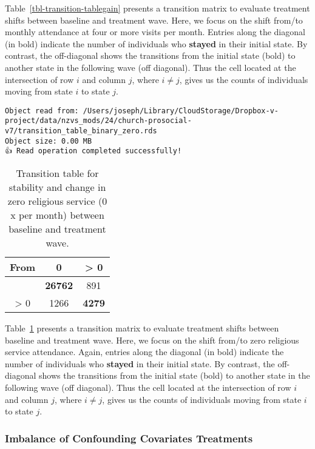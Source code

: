 \documentclass[
  single column]{article}
\begin{document}
Table~\ref{tbl-transition-tablegain} presents a transition matrix to
evaluate treatment shifts between baseline and treatment wave. Here, we
focus on the shift from/to monthly attendance at four or more visits per
month. Entries along the diagonal (in bold) indicate the number of
individuals who \textbf{stayed} in their initial state. By contrast, the
off-diagonal shows the transitions from the initial state (bold) to
another state in the following wave (off diagonal). Thus the cell
located at the intersection of row \(i\) and column \(j\), where
\(i \neq j\), gives us the counts of individuals moving from state \(i\)
to state \(j\).

\begin{verbatim}
Object read from: /Users/joseph/Library/CloudStorage/Dropbox-v-project/data/nzvs_mods/24/church-prosocial-v7/transition_table_binary_zero.rds
Object size: 0.00 MB
👍 Read operation completed successfully!
\end{verbatim}

\begin{longtable}[]{@{}ccc@{}}

\caption{\label{tbl-transition-tableloss}Transition table for stability
and change in zero religious service (0 x per month) between baseline
and treatment wave.}

\tabularnewline

\toprule\noalign{}
From & 0 & \textgreater{} 0 \\
\midrule\noalign{}
\endhead
\bottomrule\noalign{}
\endlastfoot
0 & \textbf{26762} & 891 \\
\textgreater{} 0 & 1266 & \textbf{4279} \\

\end{longtable}

Table~\ref{tbl-transition-tableloss} presents a transition matrix to
evaluate treatment shifts between baseline and treatment wave. Here, we
focus on the shift from/to zero religious service attendance. Again,
entries along the diagonal (in bold) indicate the number of individuals
who \textbf{stayed} in their initial state. By contrast, the
off-diagonal shows the transitions from the initial state (bold) to
another state in the following wave (off diagonal). Thus the cell
located at the intersection of row \(i\) and column \(j\), where
\(i \neq j\), gives us the counts of individuals moving from state \(i\)
to state \(j\).

\subsubsection{Imbalance of Confounding Covariates
Treatments}\label{imbalance-of-confounding-covariates-treatments}
\end{document}
